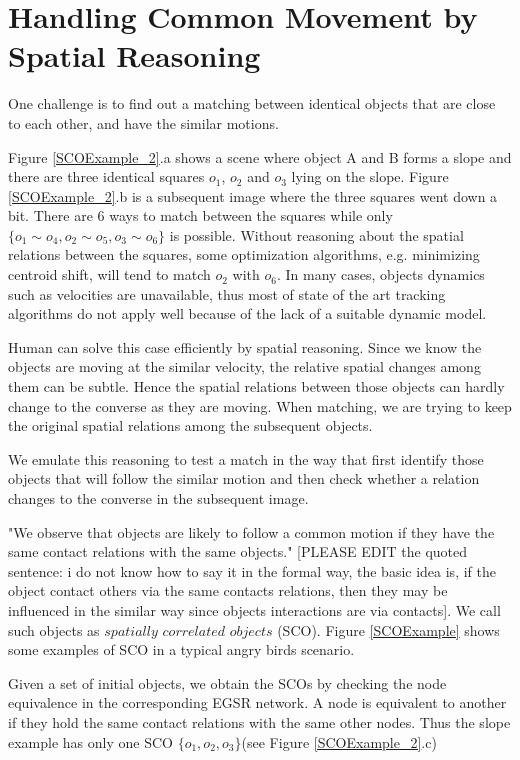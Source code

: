 \documentclass[letterpaper]{article}
\begin{document}
\section{Handling Common Movement by Spatial Reasoning}\label{trackingBySpatialReasoning}

One challenge is to find out a matching between identical objects that are close to each other, and have the similar motions.  

Figure \ref{SCOExample_2}.a  shows a scene where object A and B forms a slope and there are three identical squares $o_1$, $o_2$ and $o_3$ lying on the slope. Figure \ref{SCOExample_2}.b is a subsequent image where the three squares went down a bit. There are 6 ways to match between the squares while only $\{o_1 \sim o_4, o_2 \sim o_5, o_3 \sim o_6\}$ is possible. Without reasoning about  the spatial relations between the squares, some optimization algorithms, e.g. minimizing centroid shift, will tend to match $o_2$ with $o_6$. In many cases, objects dynamics such as velocities are unavailable, thus most of state of the art tracking algorithms do not apply well because of the lack of a suitable dynamic model. 

Human can solve this case efficiently by spatial reasoning. Since we know the objects are moving at the similar velocity, the relative spatial changes among them can be subtle. Hence the spatial relations between those objects can hardly change to the converse as they are moving. When matching, we are trying to keep the original spatial relations among the subsequent objects. 

We emulate this reasoning to test a match in the way that first identify those objects that will follow the similar motion and then check whether a relation changes to the converse in the subsequent image. 

"We observe that objects are likely to follow a common motion if they have the same contact relations with the same objects." [PLEASE EDIT the quoted sentence: i do not know how to say it in the formal way, the basic idea is, if the object contact others via the same contacts relations, then they may be influenced in the similar way since objects interactions are via contacts]. We call such objects as $spatially\,\,correlated\,\,objects$ (SCO). Figure \ref{SCOExample} shows some examples of SCO in a typical angry birds scenario.

Given a set of initial objects, we obtain the SCOs by checking the node equivalence in the corresponding EGSR network. A node is equivalent to another if they hold the same contact relations with the same other nodes. Thus the slope example has only one SCO $\{o_1, o_2, o_3\}$(see Figure \ref{SCOExample_2}.c)
\end{document}
